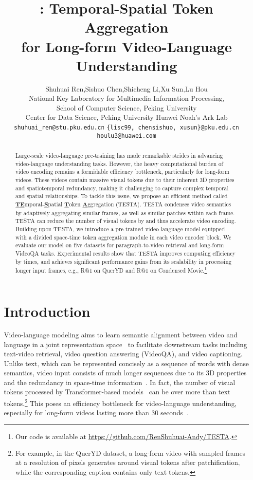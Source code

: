 \documentclass[11pt]{article}
\title{\modelname: Temporal-Spatial Token Aggregation \\ for Long-form Video-Language Understanding}
\author{Shuhuai Ren,\quad Sishuo Chen,\quad Shicheng Li,\quad Xu Sun,\quad Lu Hou\\
National Key Laboratory for Multimedia Information Processing, 
\\School of Computer Science, Peking University\\
Center for Data Science, Peking University 
Huawei Noah's Ark Lab\\
\texttt{shuhuai\_ren@stu.pku.edu.cn} \quad 
  \texttt{\{lisc99, chensishuo, xusun\}@pku.edu.cn} \\ \texttt{houlu3@huawei.com} \\
}
\newcommand{\acronym}[1]{\underline{\textbf{#1}}}
\begin{document}
\maketitle
\begin{abstract}


Large-scale video-language pre-training has made remarkable strides in advancing video-language understanding tasks. 
However, the heavy computational burden of video encoding remains a formidable efficiency bottleneck, particularly for long-form videos. 
These videos contain massive visual tokens due to their inherent 3D properties and spatiotemporal redundancy, making it challenging to capture complex temporal and spatial relationships. 
To tackle this issue, we propose an efficient method called \acronym{TE}mporal-\acronym{S}patial \acronym{T}oken \acronym{A}ggregation (TESTA). TESTA condenses video semantics by adaptively aggregating similar frames, as well as similar patches within each frame.
TESTA can reduce the number of visual tokens by  and thus accelerate video encoding. 
Building upon TESTA, we introduce a pre-trained video-language model equipped with a divided space-time token aggregation module in each video encoder block. 
We evaluate our model on five datasets for paragraph-to-video retrieval and long-form VideoQA tasks. 
Experimental results show that TESTA improves computing efficiency by  times, and achieves significant performance gains from its scalability in processing longer input frames, e.g.,  R@1 on QuerYD and  R@1 on Condensed Movie.\footnote{Our code is available at \url{https://github.com/RenShuhuai-Andy/TESTA}.}

\end{abstract}

\section{Introduction}
Video-language modeling aims to learn semantic alignment between video and language in a joint representation space~\citep{Xu2021VideoCLIPCP, Lei2021LessIM} to facilitate downstream tasks including text-video retrieval, video question answering (VideoQA), and video captioning. 
Unlike text, which can be represented concisely as a sequence of words with dense semantics, video input consists of much longer sequences due to its 3D properties and the redundancy in space-time information~\citep{He2021MaskedAA, Tong2022VideoMAEMA}. 
In fact, the number of visual tokens processed by Transformer-based models~\citep{Fu2021VIOLETE, Cheng2022VindLUAR, Ye2022HiTeAHT, Li2021AlignAP, Wang2022OmniVLOF} can be over  more than text tokens.\footnote{For example, in the QuerYD dataset, a long-form video with  sampled frames at a resolution of  pixels generates around  visual tokens after patchification, while the corresponding caption contains only  text tokens.} 
This poses an efficiency bottleneck for video-language understanding, 
especially for long-form videos lasting more than 30 seconds~\citep{Wu2021TowardsLV, Sun2022LongFormVP}.
\end{document}
